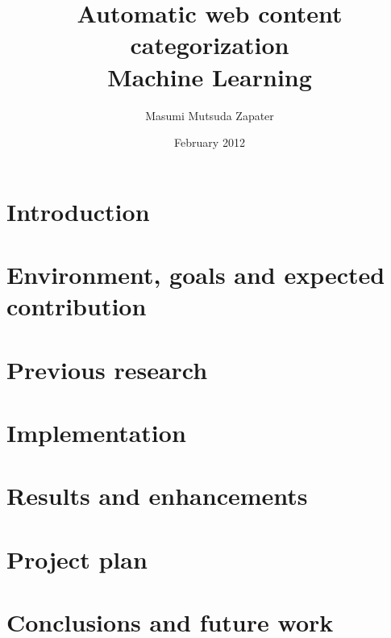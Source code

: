 \documentclass[12pt, a4paper , titlepage]{report}
\author{Masumi Mutsuda Zapater}
\title{Automatic web content categorization \\ Machine Learning}
\date{February 2012}
\begin{document}
\maketitle



\tableofcontents


\chapter{Introduction}


\chapter[Environment and goals]{Environment, goals and expected contribution}
\label{chap:flowsight}


\chapter{Previous research}
\label{chap:research}


\chapter{Implementation}
\label{chap:implementation}


\chapter[Results \& enhancements]{Results and enhancements}
\label{chap:enhancements}


\chapter{Project plan}
\label{chap:plan}



\chapter[Conclusions]{Conclusions and future work}
\label{chap:conclusions}


\cleardoublepage
{}

\end{document}

